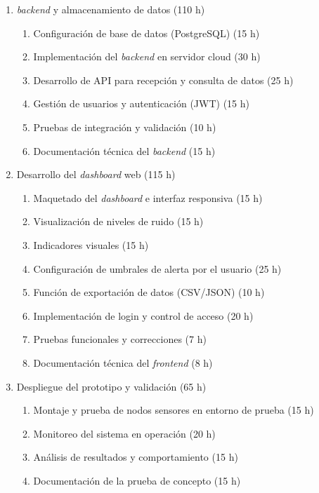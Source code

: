 \documentclass[
11pt, %
]{charter}
\begin{document}
\begin{enumerate}
    \item \textit{backend} y almacenamiento de datos (110 h)
    \begin{enumerate}
        \item Configuración de base de datos (PostgreSQL) (15 h) 
        \item Implementación del \textit{backend} en servidor cloud (30 h) 
        \item Desarrollo de API para recepción y consulta de datos (25 h) 
        \item Gestión de usuarios y autenticación (JWT) (15 h) 
        \item Pruebas de integración y validación (10 h)
        \item Documentación técnica del \textit{backend} (15 h) 
    \end{enumerate}

    \item Desarrollo del \textit{dashboard} web (115 h)
    \begin{enumerate}
        \item Maquetado del \textit{dashboard} e interfaz responsiva (15 h) 
        \item Visualización de niveles de ruido (15 h) 
        \item Indicadores visuales (15 h) 
        \item Configuración de umbrales de alerta por el usuario (25 h) 
        \item Función de exportación de datos (CSV/JSON) (10 h) 
        \item Implementación de login y control de acceso (20 h) 
        \item Pruebas funcionales y correcciones (7 h) 
        \item Documentación técnica del \textit{frontend} (8 h) 
    \end{enumerate}

    \item Despliegue del prototipo y validación (65 h)
    \begin{enumerate}
        \item Montaje y prueba de nodos sensores en entorno de prueba (15 h) 
        \item Monitoreo del sistema en operación (20 h) 
        \item Análisis de resultados y comportamiento (15 h) 
        \item Documentación de la prueba de concepto (15 h) 
    \end{enumerate}


\end{enumerate}
\end{document}

